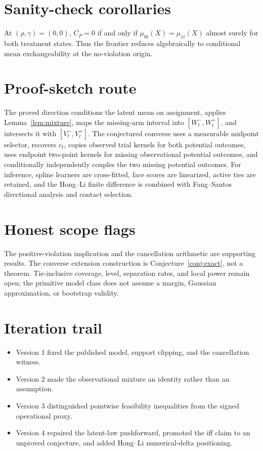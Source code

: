 \documentclass[11pt]{article}
\theoremstyle{definition}
\theoremstyle{plain}
\theoremstyle{remark}
\begin{document}
\section{Sanity-check corollaries}
At $(\rho,\gamma)=(0,0)$, $C_P=0$ if and only if $\mu_{0t}(X)=\mu_{1t}(X)$ almost surely for both treatment states.  Thus the frontier reduces algebraically to conditional mean exchangeability at the no-violation origin.

\section{Proof-sketch route}
The proved direction conditions the latent mean on assignment, applies Lemma~\ref{lem:mixture}, maps the missing-arm interval into $[W_t^-,W_t^+]$, and intersects it with $[V_t^-,V_t^+]$.  The conjectured converse uses a measurable midpoint selector, recovers $c_t$, copies observed trial kernels for both potential outcomes, uses endpoint two-point kernels for missing observational potential outcomes, and conditionally independently couples the two missing potential outcomes.  For inference, spline learners are cross-fitted, face scores are linearized, active ties are retained, and the Hong--Li finite difference is combined with Fang--Santos directional analysis and contact selection.

\section{Honest scope flags}
The positive-violation implication and the cancellation arithmetic are supporting results.  The converse extension construction is Conjecture~\ref{conj:exact}, not a theorem.  Tie-inclusive coverage, level, separation rates, and local power remain open; the primitive model class does not assume a margin, Gaussian approximation, or bootstrap validity.

\section{Iteration trail}
\begin{itemize}[leftmargin=*]
\item Version 1 fixed the published model, support clipping, and the cancellation witness.
\item Version 2 made the observational mixture an identity rather than an assumption.
\item Version 3 distinguished pointwise feasibility inequalities from the signed operational proxy.
\item Version 4 repaired the latent-law pushforward, promoted the iff claim to an unproved conjecture, and added Hong--Li numerical-delta positioning.
\end{itemize}
\end{document}
